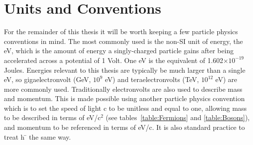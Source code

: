 \section{Units and Conventions}
 
For the remainder of this thesis it will be worth keeping a few particle physics conventions in mind.  
The most commonly used is the non-SI unit of energy, the \gls{eV}, which is the amount of energy a singly-charged particle gains after being accelerated across a potential of 1 Volt.  
One eV is the equivalent of 1.602$\times 10^{-19}$ Joules.  
Energies relevant to this thesis are typically be much larger than a single eV, so gigaelectronvolt (GeV, $10^9$ eV) and teraelectronvolts  (TeV, $10^{12}$ eV) are more commonly used.  
Traditionally electronvolts are also used to describe mass and momentum.  
This is made possible using another particle physics convention which is to set the speed of light c to be unitless and equal to one, allowing mass to be described in terms of eV/c$^2$ (see tables~\ref{table:Fermions} and \ref{table:Bosons}), and momentum to be referenced in terms of eV/c.  
It is also standard practice to treat h ̄ the same way.

